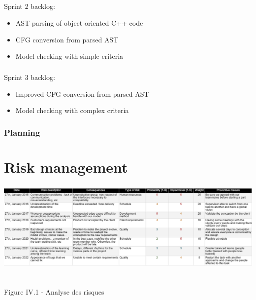 \documentclass{report}
\begin{document}
\paragraph{}
\hspace{4mm}\textnormal{Sprint 2 backlog:}

\vspace{4mm}
\begin{itemize}
\item AST parsing of object oriented C++ code\vspace{1mm}
\item CFG conversion from parsed AST\vspace{1mm}
\item Model checking with simple criteria\vspace{1mm}
\end{itemize}

\paragraph{}
\hspace{4mm}\textnormal{Sprint 3 backlog:}

\vspace{4mm}
\begin{itemize}
\item Improved CFG conversion from parsed AST\vspace{1mm}
\item Model checking with complex criteria\vspace{1mm}
\end{itemize}

\subsection{Planning}


\chapter{Risk management}

\paragraph{}
\hspace{4mm}\textnormal{}

%
\begin{center}
\includegraphics[scale=0.5]{data/risks.png}
~\\~\\Figure IV.1 - Analyse des risques
\end{center}
\end{document}
